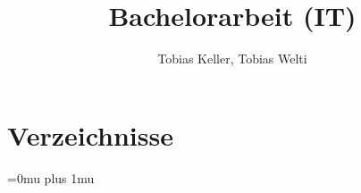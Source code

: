 %
%




\title{Bachelorarbeit (IT)}
\author{Tobias Keller, Tobias Welti}





\setcounter{page}{1}



\tableofcontents
\listoftodos
\newpage















\chapter{Verzeichnisse}\label{chap.verzeichnisse}
\Urlmuskip=0mu plus 1mu\relax
 
 \begingroup
 \raggedright
 
 \endgroup \newpage
 \listoffigures
 \listoftables
 \printglossary
 \printglossary[type=acronym]
 \lstlistoflistings
 




